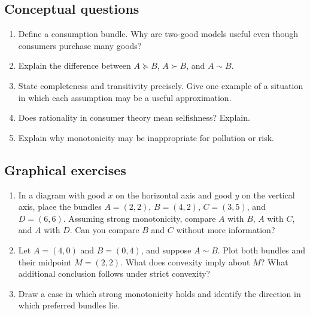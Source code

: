 \subsection*{Conceptual questions}
\begin{enumerate}[label=\arabic*.]
  \item Define a consumption bundle. Why are two-good models useful even though consumers purchase many goods?
  \item Explain the difference between $A\succeq B$, $A\succ B$, and $A\sim B$.
  \item State completeness and transitivity precisely. Give one example of a situation in which each assumption may be a useful approximation.
  \item Does rationality in consumer theory mean selfishness? Explain.
  \item Explain why monotonicity may be inappropriate for pollution or risk.
\end{enumerate}

\subsection*{Graphical exercises}
\begin{enumerate}[resume,label=\arabic*.]
  \item In a diagram with good $x$ on the horizontal axis and good $y$ on the vertical axis, place the bundles $A=(2,2)$, $B=(4,2)$, $C=(3,5)$, and $D=(6,6)$. Assuming strong monotonicity, compare $A$ with $B$, $A$ with $C$, and $A$ with $D$. Can you compare $B$ and $C$ without more information?
  \item Let $A=(4,0)$ and $B=(0,4)$, and suppose $A\sim B$. Plot both bundles and their midpoint $M=(2,2)$. What does convexity imply about $M$? What additional conclusion follows under strict convexity?
  \item Draw a case in which strong monotonicity holds and identify the direction in which preferred bundles lie.
\end{enumerate}


